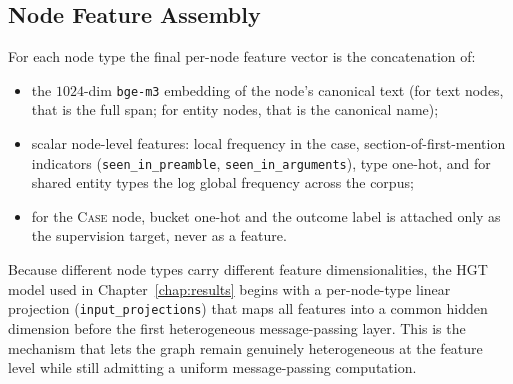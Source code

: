 \subsection{Node Feature Assembly}

For each node type the final per-node feature vector is the
concatenation of:

\begin{sloppypar}
\begin{itemize}
  \item the $1024$-dim \texttt{bge-m3} embedding of the node's canonical
    text (for text nodes, that is the full span; for entity nodes,
    that is the canonical name);
  \item scalar node-level features: local frequency in the case,
    section-of-first-mention indicators (\texttt{seen\_in\_preamble},
    \texttt{seen\_in\_arguments}), type one-hot, and for shared entity
    types the log global frequency across the corpus;
  \item for the \textsc{Case} node, bucket one-hot and the outcome
    label is attached only as the supervision target, never as a
    feature.
\end{itemize}
\end{sloppypar}

Because different node types carry different feature dimensionalities,
the HGT model used in Chapter~\ref{chap:results} begins with a
per-node-type linear projection (\texttt{input\_projections}) that maps
all features into a common hidden dimension before the first
heterogeneous message-passing layer. This is the mechanism that lets
the graph remain genuinely heterogeneous at the feature level while
still admitting a uniform message-passing computation.
